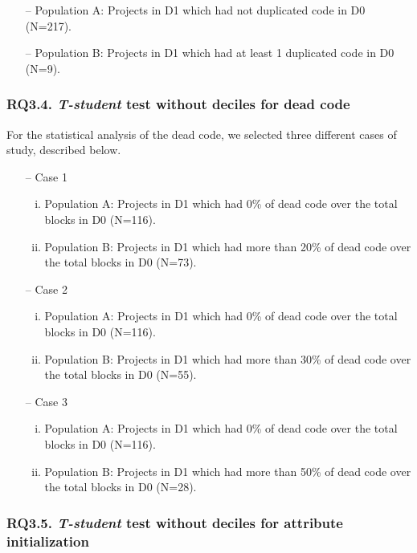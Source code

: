 \begin{itemize}
    \item[--] Population A: Projects in D1 which had not duplicated code in D0 (N=217).
    \item[--] Population B: Projects in D1 which had at least 1 duplicated code in D0 (N=9).
\end{itemize}


\subsubsection{RQ3.4. \textit{T-student} test without deciles for dead code}
\label{subsubsec:RQ3_4_statistical}

For the statistical analysis of the dead code, we selected three different cases of study, described below.

\begin{itemize}
    \item[--] Case 1
    \begin{enumerate}[(i)]
        \item Population A: Projects in D1 which had 0\% of dead code over the total blocks in D0 (N=116).
        \item Population B: Projects in D1 which had more than 20\% of dead code over the total blocks in D0 (N=73).
    \end{enumerate}
    \item[--] Case 2
    \begin{enumerate}[(i)]
        \item Population A: Projects in D1 which had 0\% of dead code over the total blocks in D0 (N=116).
        \item Population B: Projects in D1 which had more than 30\% of dead code over the total blocks in D0 (N=55).
    \end{enumerate}
    \item[--] Case 3
    \begin{enumerate}[(i)]
        \item Population A: Projects in D1 which had 0\% of dead code over the total blocks in D0 (N=116).
        \item Population B: Projects in D1 which had more than 50\% of dead code over the total blocks in D0 (N=28).
    \end{enumerate}
\end{itemize}



\subsubsection{RQ3.5. \textit{T-student} test without deciles for attribute initialization}
\label{subsubsec:RQ3_5_statistical}

